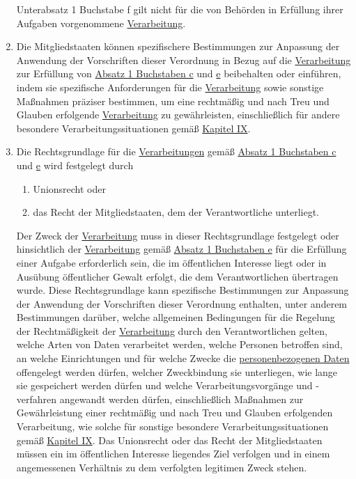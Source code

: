 \begin{enumerate}
\begin{enumerate}
  \end{enumerate}

  Unterabsatz 1 Buchstabe f gilt nicht für die von Behörden in Erfüllung ihrer Aufgaben vorgenommene \hyperref[itm:04-2]{Verarbeitung}.

  \item Die Mitgliedstaaten können spezifischere Bestimmungen zur Anpassung der Anwendung der Vorschriften dieser
   Verordnung in Bezug auf die \hyperref[itm:04-2]{Verarbeitung} zur Erfüllung von \hyperref[itm:06-1c]{Absatz 1 Buchstaben c} und \hyperref
   [itm:06-1e]{e} beibehalten oder einführen, indem sie spezifische Anforderungen für die \hyperref[itm:04-2]{Verarbeitung} sowie sonstige
   Maßnahmen präziser bestimmen, um eine rechtmäßig und nach Treu und Glauben erfolgende \hyperref[itm:04-2]{Verarbeitung} zu gewährleisten,
   einschließlich für andere besondere Verarbeitungssituationen gemäß \hyperref[part:9]{Kapitel IX}.
  \label{itm:06-2}

  \item Die Rechtsgrundlage für die \hyperref[itm:04-2]{Verarbeitungen} gemäß \hyperref[itm:06-1c]{Absatz 1 Buchstaben c} und \hyperref
   [itm:06-1e]{e} wird festgelegt durch
  \label{itm:06-3}

  \begin{enumerate}
  
    \item Unionsrecht oder
    \label{itm:06-3a}

    \item das Recht der Mitgliedstaaten, dem der Verantwortliche unterliegt.
    \label{itm:06-3b}

  \end{enumerate}

  Der Zweck der \hyperref[itm:04-2]{Verarbeitung} muss in dieser Rechtsgrundlage festgelegt oder hinsichtlich der \hyperref[itm:04-2]{Verarbeitung} gemäß
  \hyperref[itm:06-1e]{Absatz 1 Buchstaben e} für die Erfüllung einer Aufgabe erforderlich sein, die im öffentlichen
   Interesse liegt oder in Ausübung öffentlicher Gewalt erfolgt, die dem Verantwortlichen übertragen wurde. Diese
   Rechtsgrundlage kann spezifische Bestimmungen zur Anpassung der Anwendung der Vorschriften dieser Verordnung
   enthalten, unter anderem Bestimmungen darüber, welche allgemeinen Bedingungen für die Regelung der Rechtmäßigkeit
   der \hyperref[itm:04-2]{Verarbeitung} durch den Verantwortlichen gelten, welche Arten von Daten verarbeitet werden, welche Personen
   betroffen sind, an welche Einrichtungen und für welche Zwecke die \hyperref[itm:04-1]{personenbezogenen Daten} offengelegt werden dürfen,
   welcher Zweckbindung sie unterliegen, wie lange sie gespeichert werden dürfen und welche Verarbeitungsvorgänge
   und -verfahren angewandt werden dürfen, einschließlich Maßnahmen zur Gewährleistung einer rechtmäßig und nach Treu
   und Glauben erfolgenden Verarbeitung, wie solche für sonstige besondere Verarbeitungssituationen gemäß \hyperref
   [part:9]{Kapitel IX}. Das Unionsrecht oder das Recht der Mitgliedstaaten müssen ein im öffentlichen Interesse
   liegendes Ziel verfolgen und in einem angemessenen Verhältnis zu dem verfolgten legitimen Zweck stehen.


\end{enumerate}
